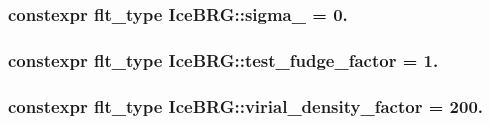 \hypertarget{namespaceIceBRG_a110c5768e115f02bf29631b9f0bde3cc}{
\subsubsection[{sigma\-\_\-8}]{\setlength{\rightskip}{0pt plus 5cm}constexpr {\bf flt\-\_\-type} Ice\-B\-R\-G\-::sigma\-\_ = 0.}}\label{namespaceIceBRG_a110c5768e115f02bf29631b9f0bde3cc}
\hypertarget{namespaceIceBRG_ada4d38aafd54f8dff69cf92960cfa2a9}{
\subsubsection[{test\-\_\-fudge\-\_\-factor}]{\setlength{\rightskip}{0pt plus 5cm}constexpr {\bf flt\-\_\-type} Ice\-B\-R\-G\-::test\-\_\-fudge\-\_\-factor = 1.}}\label{namespaceIceBRG_ada4d38aafd54f8dff69cf92960cfa2a9}
\hypertarget{namespaceIceBRG_aefc8a3f77d90888480c87cde4e641f9e}{
\subsubsection[{virial\-\_\-density\-\_\-factor}]{\setlength{\rightskip}{0pt plus 5cm}constexpr {\bf flt\-\_\-type} Ice\-B\-R\-G\-::virial\-\_\-density\-\_\-factor = 200.}}\label{namespaceIceBRG_aefc8a3f77d90888480c87cde4e641f9e}
